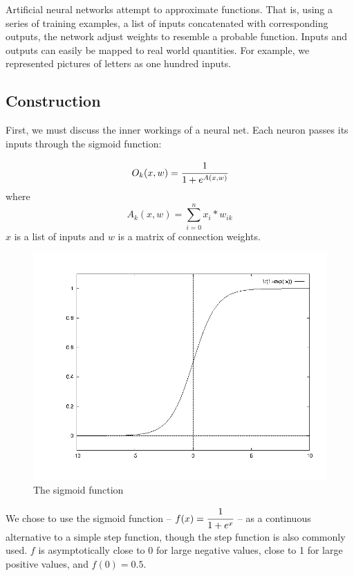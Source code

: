 \documentclass[11pt,a4paper]{article}
\begin{document}
Artificial neural networks attempt to approximate functions. That is, using a series of training examples, a list of inputs concatenated with corresponding outputs, the network adjust weights to resemble a probable function. Inputs and outputs can easily be mapped to real world quantities. For example, we represented pictures of letters as one hundred inputs.

\subsection{Construction}
\label{Artificial Neural Nets:Construction}

First, we must discuss the inner workings of a neural net. Each neuron passes its inputs through the sigmoid function:

\[
O_k(x, w) = \cfrac{1}{1 + e^{A(x, w)}} 
\]
where 
\[
A_k(x, w) = \sum_{i=0}^n{x_i*w_{ik}}
\]
$x$ is a list of inputs and $w$ is a matrix of connection weights.

\begin{figure}
  \begin{center}
	\includegraphics[scale=.3]{sigmoid.png}
  \end{center}
  \caption{The sigmoid function}
\end{figure}

We chose to use the sigmoid function -- $f(x) = \cfrac{1}{1 + e^x}$ -- as a continuous alternative to a simple step function, though the step function is also commonly used. $f$ is asymptotically close to 0 for large negative values, close to 1 for large positive values, and $f(0) = 0.5$.
\end{document}
